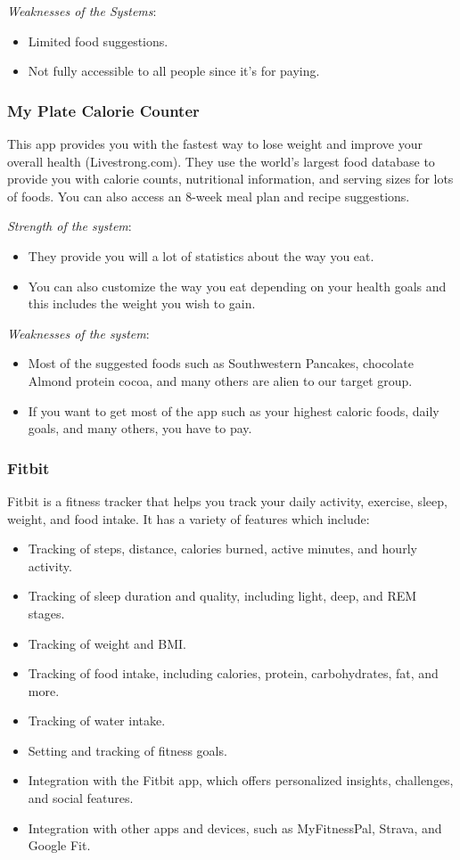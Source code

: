 \documentclass{article}
\begin{document}
\textit{Weaknesses of the Systems}:
\begin{itemize}
    \item Limited food suggestions.
    \item Not fully accessible to all people since it’s for paying.
\end{itemize}

\subsubsection{My Plate Calorie Counter}
This app provides you with the fastest way to lose weight and improve your overall health (Livestrong.com). They use the world’s largest food database to provide you with calorie counts, nutritional information, and serving sizes for lots of foods. You can also access an 8-week meal plan and recipe suggestions.

\textit{Strength of the system}:
\begin{itemize}
    \item They provide you will a lot of statistics about the way you eat.
    \item You can also customize the way you eat depending on your health goals and this includes the weight you wish to gain.
\end{itemize}

\textit{Weaknesses of the system}:
\begin{itemize}
    \item Most of the suggested foods such as Southwestern Pancakes, chocolate Almond protein cocoa, and many others are alien to our target group.
    \item If you want to get most of the app such as your highest caloric foods, daily goals, and many others, you have to pay.
\end{itemize}

\subsubsection{Fitbit}
Fitbit is a fitness tracker that helps you track your daily activity, exercise, sleep, weight, and food intake. It has a variety of features which include:

\begin{itemize}
    \item Tracking of steps, distance, calories burned, active minutes, and hourly activity.
    \item Tracking of sleep duration and quality, including light, deep, and REM stages.
    \item Tracking of weight and BMI.
    \item Tracking of food intake, including calories, protein, carbohydrates, fat, and more.
    \item Tracking of water intake.
    \item Setting and tracking of fitness goals.
    \item Integration with the Fitbit app, which offers personalized insights, challenges, and social features.
    \item Integration with other apps and devices, such as MyFitnessPal, Strava, and Google Fit.
\end{itemize}
\end{document}
